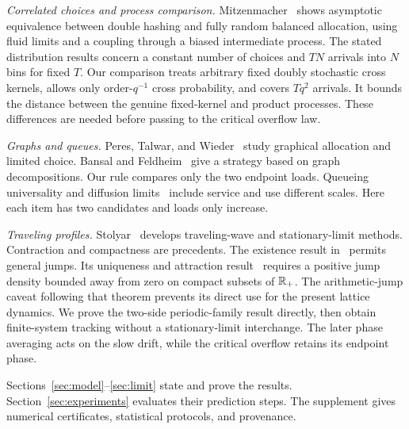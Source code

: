 \textit{Correlated choices and process comparison.}
Mitzenmacher~\cite{doublehash,doublecoupling} shows asymptotic equivalence
between double hashing and fully random balanced allocation, using fluid
limits and a coupling through a biased intermediate process.
The stated distribution results concern a constant number of choices and
$TN$ arrivals into $N$ bins for fixed $T$.
Our comparison treats arbitrary fixed doubly stochastic cross kernels,
allows only order-$q^{-1}$ cross probability, and covers $Tq^2$ arrivals.
It bounds the distance between the genuine fixed-kernel and product processes.
These differences are needed before passing to the critical overflow law.

\textit{Graphs and queues.}
Peres, Talwar, and Wieder~\cite{ptw} study graphical allocation and limited
choice. Bansal and Feldheim~\cite{bf} give a strategy based on graph
decompositions. Our rule compares only the two endpoint loads.
Queueing universality and diffusion limits~\cite{universality,bmw,atar}
include service and use different scales. Here each item has two candidates
and loads only increase.

\textit{Traveling profiles.}
Stolyar~\cite{stolyarwave,stolyarstationary} develops traveling-wave and
stationary-limit methods. Contraction and compactness are precedents.
The existence result in~\cite[Theorem 3]{stolyarwave} permits general jumps.
Its uniqueness and attraction result~\cite[Theorem 4]{stolyarwave} requires
a positive jump density bounded away from zero on compact subsets of
$\mathbb R_+$. The arithmetic-jump caveat following that theorem prevents its direct
use for the present lattice dynamics. We prove the two-side periodic-family
result directly, then obtain finite-system tracking without a stationary-limit
interchange. The later phase averaging acts on the slow drift, while the
critical overflow retains its endpoint phase.

Sections~\ref{sec:model}--\ref{sec:limit} state and prove the results.
Section~\ref{sec:experiments} evaluates their prediction steps.
The supplement gives numerical certificates, statistical protocols, and provenance.
